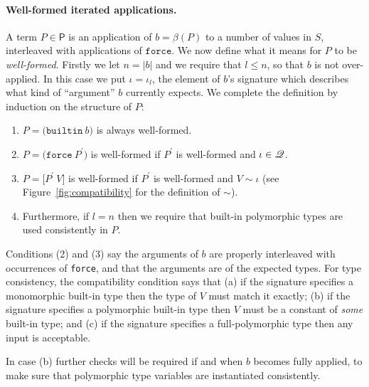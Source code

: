 \paragraph{Well-formed iterated applications.} A term $P \in \textsf{P}$ is
an application of $b = \beta(P)$ to a number of values in $S$, interleaved with
applications of $\texttt{force}$.  We now define what it means for $P$ to be
\textit{well-formed}.  Firstly we let $n = \left|b\right| $ and we require that
$l \leq n$, so that $b$ is not over-applied.  In this case we put
$\iota=\iota_l$, the element of $b$'s signature which describes what kind of
``argument'' $b$ currently expects.  We complete the definition by induction on
the structure of $P$:
\begin{enumerate}
\item $P=\mathtt{(builtin}\ b \mathtt{)}$ is always well-formed.
\item $P=\mathtt{(force}\ P^{\prime}\mathtt{)}$ is well-formed if $P^{\prime}$ is well-formed and $\iota \in \mathscr{Q}$.
\item $P=\mathtt{[}P^{\prime}\ V\mathtt{]}$ is well-formed if $P^{\prime}$ is
  well-formed and $V \sim \iota$ (see Figure~\ref{fig:compatibility} for the
  definition of $\sim$).
\item Furthermore, if $l = n$ then we require that built-in polymorphic types
  are used consistently in $P$.
\end{enumerate}


\noindent Conditions (2) and (3) say the arguments of $b$ are properly
interleaved with occurrences of \texttt{force}, and that the arguments are of
the expected types.  For type consistency, the compatibility condition says that
(a) if the signature specifies a monomorphic built-in type then the type of $V$
must match it exactly; (b) if the signature specifies a polymorphic built-in
type then $V$ must be a constant of \textit{some} built-in type; and (c) if the
signature specifies a full-polymorphic type then any input is acceptable.

In case (b) further checks will be required if and when $b$ becomes fully
applied, to make sure that polymorphic type variables are instantiated
consistently.

